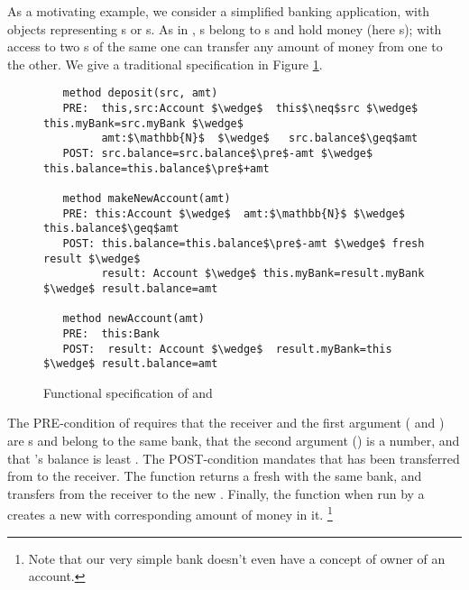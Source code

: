 

As a motivating example, we consider a simplified banking application,
with objects representing s or s. 
As in \cite{ELang},   s belong to s and hold money (here s);  
with access  to two s of the same   one can  transfer any amount of money from
 one to the other.  We give a traditional specification in Figure \ref{fig:BankSpec}.

\begin{figure}[htbp] 
\begin{lstlisting}
   method deposit(src, amt)
   PRE:  this,src:Account $\wedge$  this$\neq$src $\wedge$ this.myBank=src.myBank $\wedge$ 
         amt:$\mathbb{N}$  $\wedge$   src.balance$\geq$amt
   POST: src.balance=src.balance$\pre$-amt $\wedge$ this.balance=this.balance$\pre$+amt

   method makeNewAccount(amt)
   PRE: this:Account $\wedge$  amt:$\mathbb{N}$ $\wedge$  this.balance$\geq$amt
   POST: this.balance=this.balance$\pre$-amt $\wedge$ fresh result $\wedge$ 
         result: Account $\wedge$ this.myBank=result.myBank $\wedge$ result.balance=amt

   method newAccount(amt)
   PRE:  this:Bank  
   POST:  result: Account $\wedge$  result.myBank=this $\wedge$ result.balance=amt
 \end{lstlisting}
 \vspace{-.8cm}
\caption{Functional specification of  and 
%
}
\label{fig:functionalSpecBankAccount}
\label{fig:BankSpec}
\end{figure} 

The PRE-condition of  requires that  the receiver and the
first argument  ( and ) are s
and belong to the same bank,
that the second argument () is a number, and that 's
balance is least .
The POST-condition mandates that  has been transferred from  to the receiver.
 The function   returns a fresh  with the same bank, and transfers 
 from the receiver  to the new .
 Finally, the function  when run by a  creates a new  with corresponding 
 amount of money in it. \footnote{{Note that our very simple bank doesn't even have a concept of owner of an account.}}

